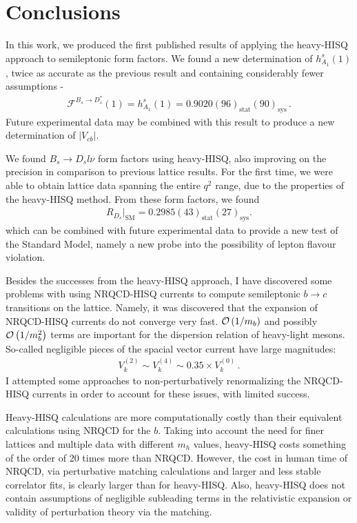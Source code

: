 ﻿\chapter{Conclusions}

In this work, we produced the first published results of applying the heavy-HISQ approach to semileptonic form factors. We found a new determination of $h_{A_1}^s(1)$, twice as accurate as the previous result and containing considerably fewer assumptions -
\begin{align}
  \mathcal{F}^{B_s\to D_s^*}(1) = h^s_{A_1}(1) = 0.9020(96)_{\text{stat}}(90)_{\text{sys}}\,.
\end{align}
Future experimental data may be combined with this result to produce a new determination of $|V_{cb}|$.

We found $B_s\to D_sl\nu$ form factors using heavy-HISQ, also improving on the precision in comparison to previous lattice results. For the first time, we were able to obtain lattice data spanning the entire $q^2$ range, due to the properties of the heavy-HISQ method. From these form factors, we found
\begin{align}
  R_{D_s}|_{\text{SM}} = 0.2985(43)_{\text{stat}}(27)_{\text{sys}}.
\end{align}
which can be combined with future experimental data to provide a new test of the Standard Model, namely a new probe into the possibility of lepton flavour violation.

Besides the successes from the heavy-HISQ approach, I have discovered some problems with using NRQCD-HISQ currents to compute semileptonic $b\to c$ transitions on the lattice. Namely, it was discovered that the expansion of NRQCD-HISQ currents do not converge very fast. $\mathcal{O}\left( 1/m_b \right)$ and possibly $\mathcal{O}\left( 1/m_b^2 \right)$ terms are important for the dispersion relation of heavy-light mesons. So-called negligible pieces of the spacial vector current have large magnitudes:
\begin{align}
  V_k^{(2)}\sim V_k^{(4)} \sim 0.35\times V_k^{(0)}\,.
\end{align}
I attempted some approaches to non-perturbatively renormalizing the NRQCD-HISQ currents in order to account for these issues, with limited success. 

Heavy-HISQ calculations are more computationally costly than their equivalent calculations using NRQCD for the $b$. Taking into account the need for finer lattices and multiple data with different $m_h$ values, heavy-HISQ costs something of the order of 20 times more than NRQCD. However, the cost in human time of NRQCD, via perturbative matching calculations and larger and less stable correlator fits, is clearly larger than for heavy-HISQ. Also, heavy-HISQ does not contain assumptions of negligible subleading terms in the relativistic expansion or validity of perturbation theory via the matching.

